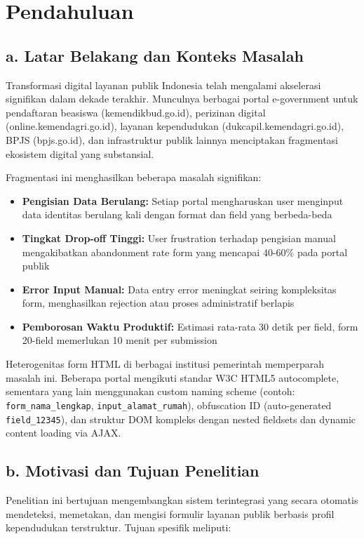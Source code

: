 \documentclass[12pt,a4paper]{article}
\begin{document}
\section{Pendahuluan}

\subsection*{a. Latar Belakang dan Konteks Masalah}

Transformasi digital layanan publik Indonesia telah mengalami akselerasi signifikan dalam dekade terakhir. Munculnya berbagai portal e-government untuk pendaftaran beasiswa (kemendikbud.go.id), perizinan digital (online.kemendagri.go.id), layanan kependudukan (dukcapil.kemendagri.go.id), BPJS (bpjs.go.id), dan infrastruktur publik lainnya menciptakan fragmentasi ekosistem digital yang substansial.

Fragmentasi ini menghasilkan beberapa masalah signifikan:
\begin{itemize}
  \item \textbf{Pengisian Data Berulang:} Setiap portal mengharuskan user menginput data identitas berulang kali dengan format dan field yang berbeda-beda
  \item \textbf{Tingkat Drop-off Tinggi:} User frustration terhadap pengisian manual mengakibatkan abandonment rate form yang mencapai 40-60\% pada portal publik
  \item \textbf{Error Input Manual:} Data entry error meningkat seiring kompleksitas form, menghasilkan rejection atau proses administratif berlapis
  \item \textbf{Pemborosan Waktu Produktif:} Estimasi rata-rata 30 detik per field, form 20-field memerlukan 10 menit per submission
\end{itemize}

Heterogenitas form HTML di berbagai institusi pemerintah memperparah masalah ini. Beberapa portal mengikuti standar W3C HTML5 autocomplete, sementara yang lain menggunakan custom naming scheme (contoh: \texttt{form\_nama\_lengkap}, \texttt{input\_alamat\_rumah}), obfuscation ID (auto-generated \texttt{field\_12345}), dan struktur DOM kompleks dengan nested fieldsets dan dynamic content loading via AJAX.

\subsection*{b. Motivasi dan Tujuan Penelitian}

Penelitian ini bertujuan mengembangkan sistem terintegrasi yang secara otomatis mendeteksi, memetakan, dan mengisi formulir layanan publik berbasis profil kependudukan terstruktur. Tujuan spesifik meliputi:
\end{document}
